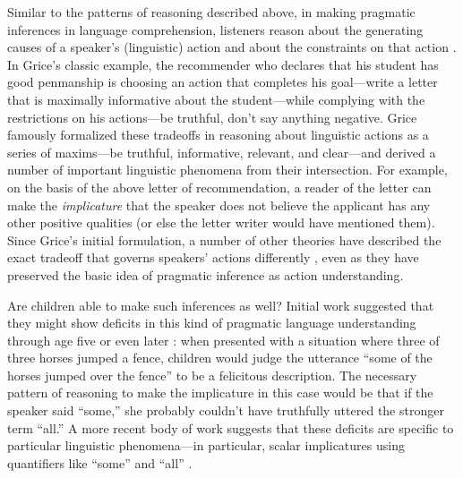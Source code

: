 \documentclass[man]{apa2}
\begin{document}

Similar to the patterns of reasoning described above, in making pragmatic inferences in language comprehension, listeners reason about the generating causes of a speaker's (linguistic) action and about the constraints on that action \cite{shafto2012}. In Grice's \citeyear{grice1975} classic example, the recommender who declares that his student has good penmanship is choosing an action that completes his goal---write a letter that is maximally informative about the student---while complying with the restrictions on his actions---be truthful, don't say anything negative. Grice famously formalized these tradeoffs in reasoning about linguistic actions as a series of maxims---be truthful, informative, relevant, and clear---and derived a number of important linguistic phenomena from their intersection. For example, on the basis of the above letter of recommendation, a reader of the letter can make the \emph{implicature} that the speaker does not believe the applicant has any other positive qualities (or else the letter writer would have mentioned them). Since Grice's initial formulation, a number of other theories have described the exact tradeoff that governs speakers' actions differently \cite{horn1984,sperber1986,clark1996,levinson2000}, even as they have preserved the basic idea of pragmatic inference as action understanding.

Are children able to make such inferences as well?  Initial work suggested that they might show deficits in this kind of pragmatic language understanding through age five or even later \cite{noveck2000,papafragou2003}: when presented with a situation where three of three horses jumped a fence, children would judge the utterance ``some of the horses jumped over the fence'' to be a felicitous description. The necessary pattern of reasoning to make the implicature in this case would be that if the speaker said ``some,'' she probably couldn't have truthfully uttered the stronger term ``all.'' A more recent body of work suggests that these deficits are specific to particular linguistic phenomena---in particular, scalar implicatures using quantifiers like ``some'' and ``all'' \cite{barner2011,katsos2011}. 
\end{document}
